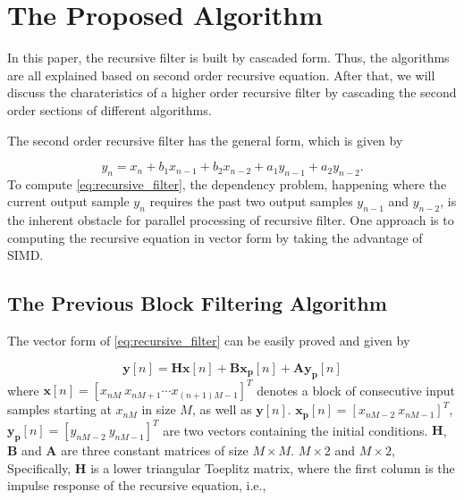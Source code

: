 \section{The Proposed Algorithm}
\label{sec:algorithm}

In this paper, the recursive filter is built by cascaded form.
Thus, the algorithms are all explained based on second order recursive equation.
After that, we will discuss the charateristics of a higher order recursive filter
by cascading the second order sections of different algorithms.

The second order recursive filter has the general form, which is given by

\begin{equation}
    \label{eq:recursive_filter}
    y_n = x_n + b_1x_{n-1} + b_2x_{n-2} + a_1y_{n-1} + a_2y_{n-2}.
\end{equation}
To compute \eqref{eq:recursive_filter}, the dependency problem, happening where the current output sample $y_n$
requires the past two output samples $y_{n-1}$ and $y_{n-2}$, is the inherent obstacle for parallel processing of recursive filter.
One approach is to computing the recursive equation in vector form by taking the advantage of SIMD. 


\subsection{The Previous Block Filtering Algorithm}

The vector form of \eqref{eq:recursive_filter} can be easily proved and given by

\begin{equation}
    \label{eq:block_filtering}
    \bm{y}[n] = \bm{H}\bm{x}[n] + \bm{B}\bm{x_p}[n] + \bm{A}\bm{y_p}[n] 
\end{equation}
where $\bm{x}[n] = \left[x_{nM}~x_{nM+1} \cdots x_{(n+1)M-1}\right]^T$ denotes a block of
consecutive input samples starting at $x_{nM}$ in size $M$, as well as $\bm{y}[n]$. 
$\bm{x_p}[n]=\left[x_{nM-2}~x_{nM-1}\right]^T$, $\bm{y_p}[n]=\left[y_{nM-2}~y_{nM-1}\right]^T$ are two vectors 
containing the initial conditions. 
$\bm{H}$, $\bm{B}$ and $\bm{A}$ are three constant matrices of size $M {\times} M$.
$M {\times} 2$ and $M {\times} 2$, 
Specifically, $\bm{H}$ is a lower triangular Toeplitz matrix, where the first
column is the impulse response of the recursive equation, i.e.,

